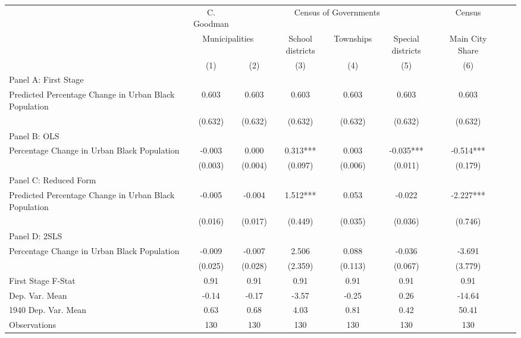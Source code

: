  \begin{tabular}{l*{8}{c}} \toprule
&\multicolumn{1}{c}{C. Goodman}&\multicolumn{4}{c}{Census of Governments}&\multicolumn{1}{c}{Census}\\\cmidrule(lr){2-2}\cmidrule(lr){3-6}\cmidrule(lr){7-7}
&\multicolumn{2}{c}{Municipalities}&\multicolumn{1}{c}{School districts}&\multicolumn{1}{c}{Townships}&\multicolumn{1}{c}{Special districts}&\multicolumn{1}{c}{Main City Share}\\\cmidrule(lr){2-3}\cmidrule(lr){4-6}\cmidrule(lr){7-7}
&\multicolumn{1}{c}{(1)}&\multicolumn{1}{c}{(2)}&\multicolumn{1}{c}{(3)}&\multicolumn{1}{c}{(4)}&\multicolumn{1}{c}{(5)}&\multicolumn{1}{c}{(6)}\\
\cmidrule(lr){1-7}
\multicolumn{6}{l}{Panel A: First Stage}\\
\cmidrule(lr){1-7}
Predicted Percentage Change in Urban Black Population&    0.603   &    0.603   &    0.603   &    0.603   &    0.603   &    0.603   \\
                &  (0.632)   &  (0.632)   &  (0.632)   &  (0.632)   &  (0.632)   &  (0.632)   \\
\cmidrule(lr){1-7}
\multicolumn{6}{l}{Panel B: OLS}\\
\cmidrule(lr){1-7}
Percentage Change in Urban Black Population&   -0.003   &    0.000   &    0.313***&    0.003   &   -0.035***&   -0.514***\\
                &  (0.003)   &  (0.004)   &  (0.097)   &  (0.006)   &  (0.011)   &  (0.179)   \\
\cmidrule(lr){1-7}
\multicolumn{6}{l}{Panel C: Reduced Form}\\
\cmidrule(lr){1-7}
Predicted Percentage Change in Urban Black Population&   -0.005   &   -0.004   &    1.512***&    0.053   &   -0.022   &   -2.227***\\
                &  (0.016)   &  (0.017)   &  (0.449)   &  (0.035)   &  (0.036)   &  (0.746)   \\
\cmidrule(lr){1-7}
\multicolumn{6}{l}{Panel D: 2SLS}\\
\cmidrule(lr){1-7}
Percentage Change in Urban Black Population&   -0.009   &   -0.007   &    2.506   &    0.088   &   -0.036   &   -3.691   \\
                &  (0.025)   &  (0.028)   &  (2.359)   &  (0.113)   &  (0.067)   &  (3.779)   \\
\midrule
First Stage F-Stat&     0.91   &     0.91   &     0.91   &     0.91   &     0.91   &     0.91   \\
Dep. Var. Mean  &    -0.14   &    -0.17   &    -3.57   &    -0.25   &     0.26   &   -14.64   \\
1940 Dep. Var. Mean&     0.63   &     0.68   &     4.03   &     0.81   &     0.42   &    50.41   \\
Observations    &      130   &      130   &      130   &      130   &      130   &      130   \\
 \bottomrule \end{tabular}

